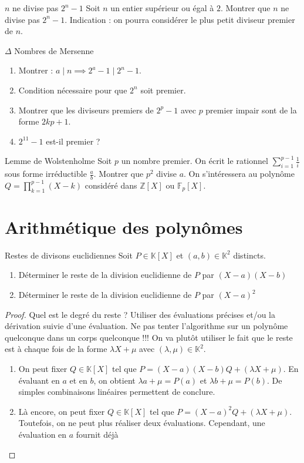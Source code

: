 \documentclass[french,a4paper]{article}
\newcommand{\Z}{\mathbb{Z}}
\newcommand{\K}{\mathbb{K}}
\newcommand{\F}{\mathbb{F}}
\theoremstyle{plain}
\theoremstyle{definition}
\theoremstyle{remark}
\begin{document}
\begin{ex}[Moulin.AG.59]{$n$ ne divise pas $2^n-1$}
	Soit $n$ un entier supérieur ou égal à $2$. Montrer que $n$ ne divise pas $2^n-1$. Indication : on pourra considérer le plus petit diviseur premier de $n$.
\end{ex}

\begin{ex}[Moulin.AG.60]{$\Delta$ Nombres de Mersenne}
	\begin{enumerate}
		\item Montrer : $a\mid n\implies 2^a-1\mid 2^n-1$.
		\item Condition nécessaire pour que $2^n$ soit premier.
		\item Montrer que les diviseurs premiers de $2^p-1$ avec $p$ premier impair sont de la forme $2kp+1$.
		\item $2^{11}-1$ est-il premier ?
	\end{enumerate}
\end{ex}

\begin{ex}[Châteaux]{Lemme de Wolstenholme}
	Soit $p$ un nombre premier. On écrit le rationnel $\displaystyle\sum_{i=1}^{p-1}\frac{1}{i}$ sous forme irréductible $\displaystyle\frac{a}{b}$. Montrer que $p^2$ divise $a$. On s'intéressera au polynôme $Q=\displaystyle\prod_{k=1}^{p-1}(X-k)$ considéré dans $\Z[X]$ ou $\F_p[X]$.
\end{ex}

\section{Arithmétique des polynômes}

\begin{ex}{Restes de divisons euclidiennes}
	Soit $P \in \K[X]$ et $(a,b) \in\K^2$ distincts. 
	\begin{enumerate}
		\item Déterminer le reste de la division euclidienne de $P$ par $(X-a)(X-b)$
		\item Déterminer le reste de la division euclidienne de $P$ par $(X-a)^2$
	\end{enumerate}
\end{ex}
\begin{proof}
	Quel est le degré du reste ? Utiliser des évaluations précises et/ou la dérivation suivie d'une évaluation. Ne pas tenter l'algorithme sur un polynôme quelconque dans un corps quelconque !!! On va plutôt utiliser le fait que le reste est à chaque fois de la forme $\lambda X + \mu$ avec $(\lambda,\mu) \in \K^2$.
	\begin{enumerate}
		\item On peut fixer $Q \in\K[X]$ tel que $P=(X-a)(X-b)Q + (\lambda X + \mu)$. En évaluant en $a$ et en $b$, on obtient $\lambda a + \mu =P(a)$ et $\lambda b + \mu = P(b)$. De simples combinaisons linéaires permettent de conclure.
		\item Là encore, on peut fixer $Q \in\K[X]$ tel que $P=(X-a)^2Q + (\lambda X + \mu)$. Toutefois, on ne peut plus réaliser deux évaluations. Cependant, une évaluation en $a$ fournit déjà
	\end{enumerate}
\end{proof}
\end{document}
